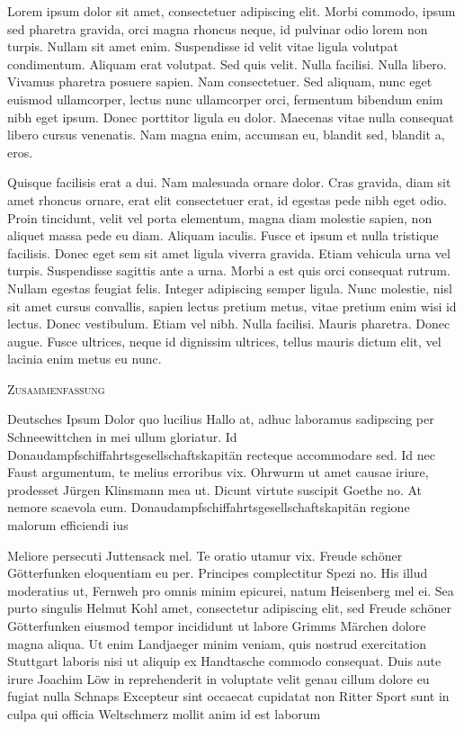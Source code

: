 Lorem ipsum dolor sit amet, consectetuer adipiscing elit. Morbi commodo, ipsum sed pharetra gravida, orci magna rhoncus neque, id pulvinar odio lorem non turpis. Nullam sit amet enim. Suspendisse id velit vitae ligula volutpat condimentum. Aliquam erat volutpat. Sed quis velit. Nulla facilisi. Nulla libero. Vivamus pharetra posuere sapien. Nam consectetuer. Sed aliquam, nunc eget euismod ullamcorper, lectus nunc ullamcorper orci, fermentum bibendum enim nibh eget ipsum. Donec porttitor ligula eu dolor. Maecenas vitae nulla consequat libero cursus venenatis. Nam magna enim, accumsan eu, blandit sed, blandit a, eros.

Quisque facilisis erat a dui. Nam malesuada ornare dolor. Cras gravida, diam sit amet rhoncus ornare, erat elit consectetuer erat, id egestas pede nibh eget odio. Proin tincidunt, velit vel porta elementum, magna diam molestie sapien, non aliquet massa pede eu diam. Aliquam iaculis. Fusce et ipsum et nulla tristique facilisis. Donec eget sem sit amet ligula viverra gravida. Etiam vehicula urna vel turpis. Suspendisse sagittis ante a urna. Morbi a est quis orci consequat rutrum. Nullam egestas feugiat felis. Integer adipiscing semper ligula. Nunc molestie, nisl sit amet cursus convallis, sapien lectus pretium metus, vitae pretium enim wisi id lectus. Donec vestibulum. Etiam vel nibh. Nulla facilisi. Mauris pharetra. Donec augue. Fusce ultrices, neque id dignissim ultrices, tellus mauris dictum elit, vel lacinia enim metus eu nunc.

\newpage
\vspace*{20pt}
	\begin{center}
	\vspace*{100pt}
	\scshape {\Large Zusammenfassung} \\ \rm
	\end{center}

Deutsches Ipsum Dolor quo lucilius Hallo at, adhuc laboramus sadipscing per Schneewittchen in mei ullum gloriatur. Id Donaudampfschiffahrtsgesellschaftskapitän recteque accommodare sed. Id nec Faust argumentum, te melius erroribus vix. Ohrwurm ut amet causae iriure, prodesset Jürgen Klinsmann mea ut. Dicunt virtute suscipit Goethe no. At nemore scaevola eum. Donaudampfschiffahrtsgesellschaftskapitän regione malorum efficiendi ius

Meliore persecuti Juttensack mel. Te oratio utamur vix. Freude schöner Götterfunken eloquentiam eu per. Principes complectitur Spezi no. His illud moderatius ut, Fernweh pro omnis minim epicurei, natum Heisenberg mel ei. Sea purto singulis Helmut Kohl amet, consectetur adipiscing elit, sed Freude schöner Götterfunken eiusmod tempor incididunt ut labore Grimms Märchen dolore magna aliqua. Ut enim Landjaeger minim veniam, quis nostrud exercitation Stuttgart laboris nisi ut aliquip ex Handtasche commodo consequat. Duis aute irure Joachim Löw in reprehenderit in voluptate velit genau cillum dolore eu fugiat nulla Schnaps Excepteur sint occaecat cupidatat non Ritter Sport sunt in culpa qui officia Weltschmerz mollit anim id est laborum